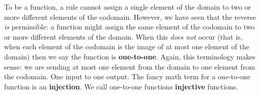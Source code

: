 \documentclass[10pt,]{book}
\newcommand{\terminology}[1]{\textbf{#1}}
\theoremstyle{plain}
\theoremstyle{definition}
\theoremstyle{definition}
\theoremstyle{definition}
\numberwithin{equation}{section}
\begin{document}
      To be a function, a rule cannot assign a single element of the domain to two or more different elements of the codomain. However, we have seen that the reverse \emph{is} permissible: a function might assign the same element of the codomain to two or more different elements of the domain. When this \emph{does not} occur (that is, when each element of the codomain is the image of at most one element of the domain) then we say the function is
      \terminology{one-to-one}. Again, this terminology makes sense: we are sending at most one element from the domain to one element from the codomain. One input to one output. The fancy math term for a one-to-one function is an
      \terminology{injection}. We call one-to-one functions
      \terminology{injective} functions.
\par
\end{document}
